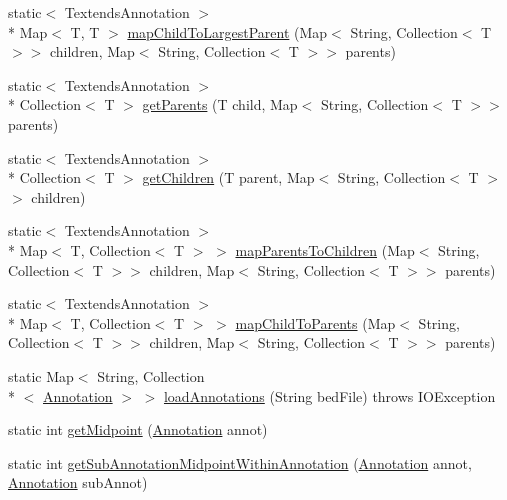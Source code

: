 \begin{DoxyCompactItemize}
\item 
static$<$ Textends\+Annotation $>$\\*
 Map$<$ T, T $>$ \hyperlink{classumms_1_1core_1_1utils_1_1_annotation_utils_ac8303f589525602b8a1d740ba6b05b30}{map\+Child\+To\+Largest\+Parent} (Map$<$ String, Collection$<$ T $>$$>$ children, Map$<$ String, Collection$<$ T $>$$>$ parents)
\item 
static$<$ Textends\+Annotation $>$\\*
 Collection$<$ T $>$ \hyperlink{classumms_1_1core_1_1utils_1_1_annotation_utils_ac03f2394577fbf5f2bf25d041f195868}{get\+Parents} (T child, Map$<$ String, Collection$<$ T $>$$>$ parents)
\item 
static$<$ Textends\+Annotation $>$\\*
 Collection$<$ T $>$ \hyperlink{classumms_1_1core_1_1utils_1_1_annotation_utils_a51fc4a9a678764303e6d94afc89df218}{get\+Children} (T parent, Map$<$ String, Collection$<$ T $>$$>$ children)
\item 
static$<$ Textends\+Annotation $>$\\*
 Map$<$ T, Collection$<$ T $>$ $>$ \hyperlink{classumms_1_1core_1_1utils_1_1_annotation_utils_aa83a2cd0521f94949b7feac6929438ed}{map\+Parents\+To\+Children} (Map$<$ String, Collection$<$ T $>$$>$ children, Map$<$ String, Collection$<$ T $>$$>$ parents)
\item 
static$<$ Textends\+Annotation $>$\\*
 Map$<$ T, Collection$<$ T $>$ $>$ \hyperlink{classumms_1_1core_1_1utils_1_1_annotation_utils_ae306f1081d2c5548bf9c320952cd8f68}{map\+Child\+To\+Parents} (Map$<$ String, Collection$<$ T $>$$>$ children, Map$<$ String, Collection$<$ T $>$$>$ parents)
\item 
static Map$<$ String, Collection\\*
$<$ \hyperlink{interfaceumms_1_1core_1_1annotation_1_1_annotation}{Annotation} $>$ $>$ \hyperlink{classumms_1_1core_1_1utils_1_1_annotation_utils_a4c807596fd83cfab73a3657ea796bebd}{load\+Annotations} (String bed\+File)  throws I\+O\+Exception 
\item 
static int \hyperlink{classumms_1_1core_1_1utils_1_1_annotation_utils_a6b7be0a704f3217b3b882dd06b07bd0b}{get\+Midpoint} (\hyperlink{interfaceumms_1_1core_1_1annotation_1_1_annotation}{Annotation} annot)
\item 
static int \hyperlink{classumms_1_1core_1_1utils_1_1_annotation_utils_aad340b093e32c429083e65070ee4a3ed}{get\+Sub\+Annotation\+Midpoint\+Within\+Annotation} (\hyperlink{interfaceumms_1_1core_1_1annotation_1_1_annotation}{Annotation} annot, \hyperlink{interfaceumms_1_1core_1_1annotation_1_1_annotation}{Annotation} sub\+Annot)
\end{DoxyCompactItemize}
